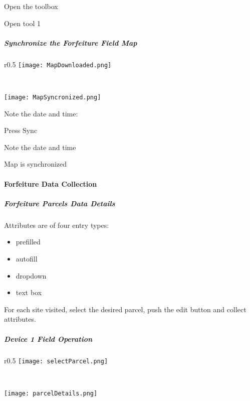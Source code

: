 \documentclass[class=book , crop=false, titlepage, twoside, multi={itemize, figure, verbatim}, float=false]{standalone}
\begin{document}
\noindent Open the toolbox
\vspace{1in}

\noindent Open tool 1
\clearpage
%
%
%
\subparagraph[Synchronize the Forfeiture Field Map]{\Large Synchronize the Forfeiture Field Map}

%
%
\begin{wrapfigure}{r}{0.5\textwidth}
\centering
\texttt{[image: MapDownloaded.png]}
\caption{Map Downloaded}
\vspace{.25in}

\HRule \\[.4cm] %
\vspace{.25in}

\texttt{[image: MapSyncronized.png]}
\caption{Map Synchronized}
\end{wrapfigure}
Note the date and time:
\vspace{1.5in}

\noindent Press {\LARGE Sync}
\vspace{2in}

\noindent Note the date and time
\vspace{1.25in}

{\Large Map is synchronized}
\clearpage
%
%
%
\paragraph{Forfeiture Data Collection}
\subparagraph{Forfeiture Parcels Data Details}

Attributes are of four entry types:
\begin{itemize}
\item prefilled
\item autofill
\item dropdown
\item text box
\end{itemize}
For each site visited, select the desired parcel, push the edit button and collect attributes.
\clearpage
%
%
%
\subparagraph[Device 1 Field Operation]{Device 1 Field Operation\texorpdfstring{\\}{}}
%
%
\begin{wrapfigure}{r}{0.5\textwidth}
\centering
\texttt{[image: selectParcel.png]}
\caption {Select Parcel}

\vspace{.25in}

\HRule \\[.4cm] %
\vspace{.25in}

\centering
\texttt{[image: parcelDetails.png]}
\caption{Parcel Details}
\end{wrapfigure}
\end{document}
